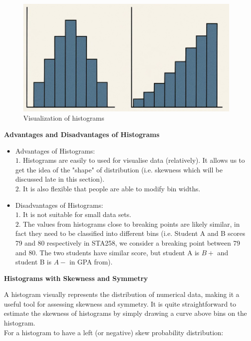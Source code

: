 \begin{figure}[H]
 \centering
 \includegraphics[scale=0.45]{Section1/img/Histogram.jpg}
 \caption{Visualization of histograms}
\end{figure} 

\textbf{Advantages and Disadvantages of Histograms}

\begin{itemize}
 \item Advantages of Histograms:\\
 $1.$ Histograms are easily to used for visualise data (relatively). It allows us to get the idea of the "shape" of distribution (i.e. skewness which will be discussed late in this section).\\
 $2.$ It is also flexible that people are able to modify bin widths.
 \item Disadvantages of Histograms:\\
 $1.$ It is not suitable for small data sets.\\
 $2.$ The values from histograms close to breaking points are likely similar, in fact they need to be classified into different bins (i.e. Student A and B scores 79 and 80 respectively in   STA258, we consider a breaking point between 79 and 80. The two students have similar score, but student A is $B+$ and student B is $A-$ in GPA from).
 \end{itemize}
 
 \noindent
\textbf{Histograms with Skewness and Symmetry}

\noindent
A histogram visually represents the distribution of numerical data, making it a useful tool for assessing skewness and symmetry. It is quite straightforward to estimate the skewness of histograms by simply drawing a curve above bins on the histogram.\\

\noindent
For a histogram to have a left (or negative) skew probability distribution:

